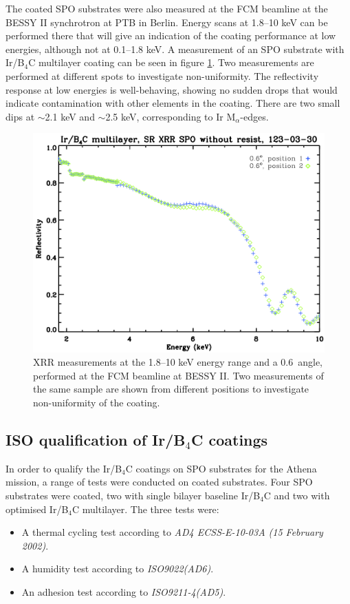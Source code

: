 The coated SPO substrates were also measured at the FCM beamline at the BESSY II synchrotron at PTB in Berlin. Energy scans at 1.8--10 keV can be performed there that will give an indication of the coating performance at low energies, although not at 0.1--1.8 keV. A measurement of an SPO substrate with Ir/B$_4$C multilayer coating can be seen in figure \ref{fig:spo_bessy}. Two measurements are performed at different spots to investigate non-uniformity. The reflectivity response at low energies is well-behaving, showing no sudden drops that would indicate contamination with other elements in the coating. There are two small dips at $\sim$2.1 keV and $\sim$2.5 keV, corresponding to Ir M$_{\alpha}$-edges.

\begin{figure}[!h]
  \center
\includegraphics[width=0.4\linewidth]{figures/athena/coating_on_spo/ml_irb4c_nores.jpg}
\caption{\footnotesize XRR measurements at the 1.8--10 keV energy range and a 0.6\degr\ angle, performed at the FCM beamline at BESSY II. Two measurements of the same sample are shown from different positions to investigate non-uniformity of the coating.}\label{fig:spo_bessy}
\end{figure}




\subsection{ISO qualification of Ir/B$_4$C coatings}\label{sec:qa_test}
In order to qualify the Ir/B$_4$C coatings on SPO substrates for the Athena mission, a range of tests were conducted on coated substrates. Four SPO substrates were coated, two with single bilayer baseline Ir/B$_4$C and two with optimised Ir/B$_4$C multilayer. The three tests were:

\begin{itemize}
 \item A thermal cycling test according to \emph{AD4 ECSS-E-10-03A (15 February 2002)}.
 \item A humidity test according to \emph{ISO9022(AD6)}.
 \item An adhesion test according to \emph{ISO9211-4(AD5)}.
\end{itemize}

